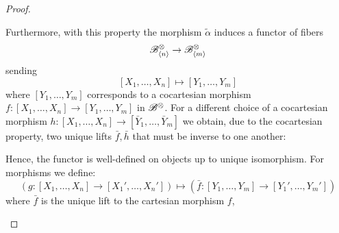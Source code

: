 \begin{proof}
\begin{enumerate}
        Furthermore, with this property the morphism $\widetilde{\alpha}$
        induces a functor of fibers
        \[
            \mathscr{B}^{\otimes}_{\langle n \rangle} \to \mathscr{B}^{\otimes}_{\langle m \rangle}
        \]
        sending
        \[
            [X_1, \dots, X_n] \mapsto [Y_1, \dots, Y_m]
        \]
        where $[Y_1, \dots, Y_m]$ corresponds to a cocartesian morphism $f
        \colon [X_1, \dots, X_n] \to [Y_1, \dots, Y_m]$ in $\mathscr{B}^{\otimes}$. For a
        different choice of a cocartesian morphism $h \colon [X_1, \dots, X_n] \to
        [\bar{Y}_1, \dots, \bar{Y}_m]$ we obtain, due to the cocartesian
        property, two unique lifts $\bar{f}, \bar{h}$ that must be inverse to
        one another:
        \begin{center}
        \end{center}
        Hence, the functor is well-defined on objects up to unique isomorphism.
        For morphisms we define:
        \[
            (g \colon [X_1, \dots, X_n] \to [X_1', \dots, X_n'])  \mapsto (\bar{f} \colon [Y_1, \dots, Y_m] \to [Y_1', \dots, Y_m'])
        \]
        where $\bar{f}$ is the unique lift to the cartesian morphism $f$,

\end{enumerate}
\end{proof}
